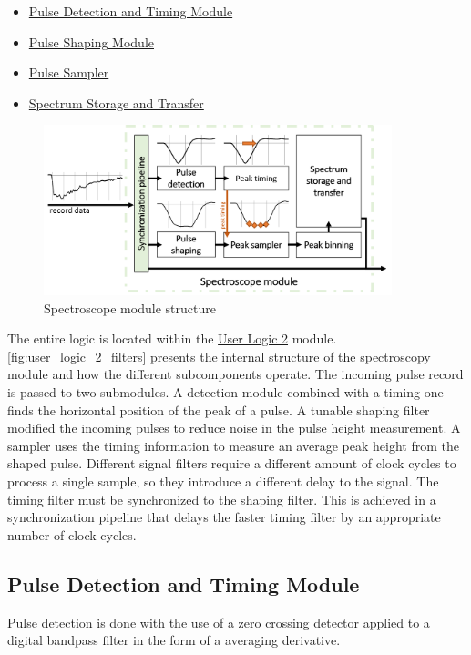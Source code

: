 \documentclass[12pt]{article}
\begin{document}
	\begin{itemize}
		\item \hyperref[ssec:pulse_detection_module]{Pulse Detection and Timing Module}
		\item \hyperref[ssec:pulse_shaping_module]{Pulse Shaping Module}
		\item \hyperref[ssec:pulse_sampler]{Pulse Sampler}
		\item \hyperref[ssec:spectrum_storage_and_transfer]{Spectrum Storage and Transfer}
	\end{itemize}

	\begin{figure}[!h]
		\centering
		\includegraphics[width=0.9\textwidth]{img/user_logic_2_filters.png}
		\caption{Spectroscope module structure}\label{fig:user_logic_2_filters}
	\end{figure}

	The entire logic is located within the \hyperref[ssec:data_flow_in_user_logic_2]{User Logic 2} module. 
	\autoref{fig:user_logic_2_filters} presents the internal structure of the spectroscopy module and how 
	the different subcomponents operate. The incoming pulse record is passed to two submodules.
	A detection module combined with a timing one finds the horizontal position of the peak of a pulse.
	A tunable shaping filter modified the incoming pulses to reduce noise in the pulse height measurement.
	A sampler uses the timing information to measure an average peak height from the shaped pulse.
	Different signal filters require a different amount of clock cycles to process a single sample, 
	so they introduce a different delay to the signal. The timing filter must be synchronized to the shaping filter.
	This is achieved in a synchronization pipeline that delays the faster timing filter 
	by an appropriate number of clock cycles.
	\newpage
	\subsection{Pulse Detection and Timing Module}\label{ssec:pulse_detection_module}
		Pulse detection is done with the use of a zero crossing detector 
		applied to a digital bandpass filter in the form of a averaging derivative.	
		
\end{document}
